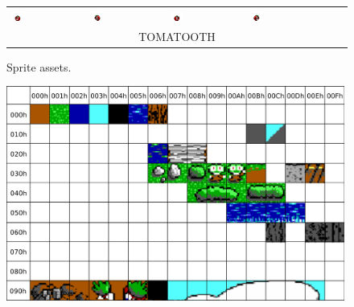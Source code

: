 \documentclass[book.tex]{subfiles}
\begin{document}
\begin{figure}[H]
\begin{table}[H]
\begin{tabularx}{\textwidth}[c]{|XXXXXX|}
      
  \includegraphics[width=0.17\textwidth]{screenshots_300dpi/game/sprite3a.png} &
  \includegraphics[width=0.17\textwidth]{screenshots_300dpi/game/sprite3b.png} &  
  \includegraphics[width=0.17\textwidth]{screenshots_300dpi/game/sprite3c.png} &
  \includegraphics[width=0.17\textwidth]{screenshots_300dpi/game/sprite3d.png} & & \\  
  \multicolumn{6}{|c|}{TOMATOOTH}  \\ \hline
    
  \end{tabularx}
  \end{table}
  \caption{Sprite assets.}
  \label{fig:sprite_assets}
 \end{figure}


\pagebreak
\begin{figure}[H] 
  \centering 
  \includegraphics[width=0.99\textwidth, frame]{screenshots_300dpi/tile16_assets.png}
\end{figure}  
\end{document}
